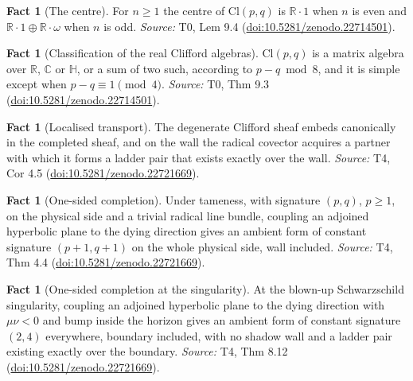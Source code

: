 \documentclass[11pt]{article}
\theoremstyle{definition}
\newtheorem{fact}[theorem]{Fact}
\theoremstyle{plain}
\providecommand{\C}{}\renewcommand{\C}{\mathbb{C}}
\providecommand{\Cl}{}\renewcommand{\Cl}{\mathrm{Cl}}
\providecommand{\HH}{}\renewcommand{\HH}{\mathbb{H}}
\providecommand{\R}{}\renewcommand{\R}{\mathbb{R}}
\begin{document}
\begin{fact}[The centre]\label{c:primer.centre}
For $n \geq 1$ the centre of $\Cl(p,q)$ is $\R \cdot 1$ when $n$ is even and $\R \cdot 1 \oplus \R \cdot \omega$ when $n$ is odd.
\emph{Source:} T0, Lem 9.4 (\href{https://doi.org/10.5281/zenodo.22714501}{doi:10.5281/zenodo.22714501}).
\end{fact}

\begin{fact}[Classification of the real Clifford algebras]\label{c:primer.classification-real-clifford-algebras}
$\Cl(p,q)$ is a matrix algebra over $\R$, $\C$ or $\HH$, or a sum of two such, according to $p - q \bmod 8$, and it is simple except when $p - q \equiv 1 \pmod 4$.
\emph{Source:} T0, Thm 9.3 (\href{https://doi.org/10.5281/zenodo.22714501}{doi:10.5281/zenodo.22714501}).
\end{fact}

\begin{fact}[Localised transport]\label{c:sheaf.localised-transport}
The degenerate Clifford sheaf embeds canonically in the completed sheaf, and on the wall the radical covector acquires a partner with which it forms a ladder pair that exists exactly over the wall.
\emph{Source:} T4, Cor 4.5 (\href{https://doi.org/10.5281/zenodo.22721669}{doi:10.5281/zenodo.22721669}).
\end{fact}

\begin{fact}[One-sided completion]\label{c:sheaf.one-sided-completion}
Under tameness, with signature $(p,q)$, $p \geq 1$, on the physical side and a trivial radical line bundle, coupling an adjoined hyperbolic plane to the dying direction gives an ambient form of constant signature $(p{+}1, q{+}1)$ on the whole physical side, wall included.
\emph{Source:} T4, Thm 4.4 (\href{https://doi.org/10.5281/zenodo.22721669}{doi:10.5281/zenodo.22721669}).
\end{fact}

\begin{fact}[One-sided completion at the singularity]\label{c:sheaf.one-sided-completion-singularity}
At the blown-up Schwarzschild singularity, coupling an adjoined hyperbolic plane to the dying direction with $\mu\nu < 0$ and bump inside the horizon gives an ambient form of constant signature $(2,4)$ everywhere, boundary included, with no shadow wall and a ladder pair existing exactly over the boundary.
\emph{Source:} T4, Thm 8.12 (\href{https://doi.org/10.5281/zenodo.22721669}{doi:10.5281/zenodo.22721669}).
\end{fact}
\end{document}
